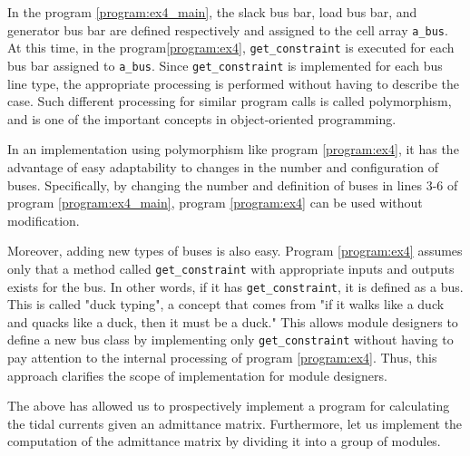 \documentclass[graybox, envcountchap]{svmult}
\begin{document}
\begin{example}
In the program \nobreak\ref{program:ex4_main}, the slack bus bar, load bus bar,
and generator bus bar are defined respectively and assigned to the cell array
\verb|a_bus|. At this time, in the program\nobreak\ref{program:ex4},
\verb|get_constraint| is executed for each bus bar assigned to \verb|a_bus|.
Since \verb|get_constraint| is implemented for each bus line type, the
appropriate processing is performed without having to describe the case. Such
different processing for similar program calls is called {polymorphism}, and is
one of the important concepts in object-oriented programming.


In an implementation using polymorphism like program \ref{program:ex4}, it has
the advantage of easy adaptability to changes in the number and configuration of
buses. Specifically, by changing the number and definition of buses in lines 3-6
of program \ref{program:ex4_main}, program \ref{program:ex4} can be used without
modification.

Moreover, adding new types of buses is also easy. Program \ref{program:ex4}
assumes only that a method called \verb|get_constraint| with appropriate inputs
and outputs exists for the bus. In other words, if it has \verb|get_constraint|,
it is defined as a bus. This is called "duck typing", a concept that comes from
"if it walks like a duck and quacks like a duck, then it must be a duck." This
allows module designers to define a new bus class by implementing only
\verb|get_constraint| without having to pay attention to the internal processing
of program \ref{program:ex4}. Thus, this approach clarifies the scope of
implementation for module designers.
\end{example}

The above has allowed us to prospectively implement a program for calculating
the tidal currents given an admittance matrix. Furthermore, let us implement the
computation of the admittance matrix by dividing it into a group of modules.
\end{document}
